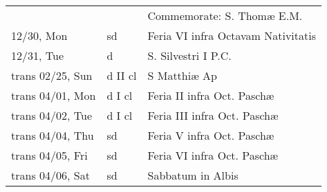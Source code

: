 \documentclass{article}
\begin{document}
\begin{longtable}{ l l l }
 & & Commemorate: S. Thomæ E.M.\\
12/30, Mon & sd & Feria VI infra Octavam Nativitatis\\
12/31, Tue & d & S. Silvestri I P.C.\\
trans 02/25, Sun & d II cl & S Matthiæ Ap\\
trans 04/01, Mon & d I cl & Feria II infra Oct. Paschæ\\
trans 04/02, Tue & d I cl & Feria III infra Oct. Paschæ\\
trans 04/04, Thu & sd & Feria V infra Oct. Paschæ\\
trans 04/05, Fri & sd & Feria VI infra Oct. Paschæ\\
trans 04/06, Sat & sd & Sabbatum in Albis\\
\end{longtable}
\end{document}
